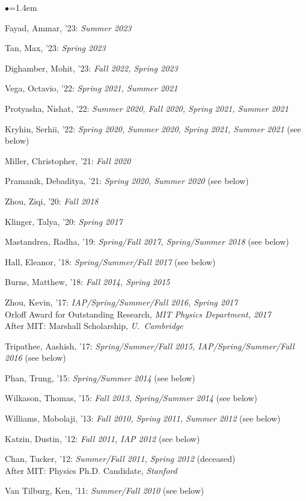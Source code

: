 \documentclass[11pt]{article}
\newcommand{\sh}{\phantom{.....}}
\newcommand{\bbl}{\begin{list}{$\bullet$}{\leftmargin=1.4em \itemsep=-1pt}}
\newcommand{\el}{\end{list}}
\begin{document}
\bbl
\item Fayad, Ammar, '23: \textit{Summer 2023}
\item Tan, Max, '23: \textit{Spring 2023}
\item Dighamber, Mohit, '23: \textit{Fall 2022, Spring 2023}
\item Vega, Octavio, '22:  \textit{Spring 2021, Summer 2021}
\item Protyasha, Nishat, '22:  \textit{Summer 2020, Fall 2020, Spring 2021, Summer 2021}
\item Kryhin, Serhii, '22:   \textit{Spring 2020, Summer 2020, Spring 2021, Summer 2021} (see below)
\item Miller, Christopher, '21:  \textit{Fall 2020}
\item Pramanik, Debaditya, '21:  \textit{Spring 2020, Summer 2020} (see below)
\item Zhou, Ziqi, '20:  \textit{Fall 2018}
\item Klinger, Talya, '20:  \textit{Spring 2017}
\item Mastandrea, Radha, '19:  \textit{Spring/Fall 2017, Spring/Summer 2018} (see below)
\item Hall, Eleanor, '18:  \textit{Spring/Summer/Fall 2017} (see below)
\item Burns, Matthew, '18:  \textit{Fall 2014, Spring 2015}
\item Zhou, Kevin, '17:  \textit{IAP/Spring/Summer/Fall 2016, Spring 2017}
\\ \sh Orloff Award for Outstanding Research, \textit{MIT Physics Department, 2017}
\\ \sh After MIT:  Marshall Scholarship, \textit{U.~Cambridge}
\item Tripathee, Aashish, '17: \textit{Spring/Summer/Fall 2015, IAP/Spring/Summer/Fall 2016} (see below)
\item Phan, Trung, '15: \textit{Spring/Summer 2014} (see below)
\item Wilkason, Thomas, '15: \textit{Fall 2013, Spring/Summer 2014} (see below)
\item Williams, Mobolaji, '13: \textit{Fall 2010, Spring 2011, Summer 2012} (see below)
\item Katzin, Dustin, '12: \textit{Fall 2011, IAP 2012} (see below)
\item Chan, Tucker, '12: \textit{Summer/Fall 2011, Spring 2012}  (deceased)
\\ \sh After MIT:   Physics Ph.D. Candidate, \textit{Stanford}
\item Van Tilburg, Ken, '11:  \textit{Summer/Fall 2010} (see below)
\el
\end{document}
